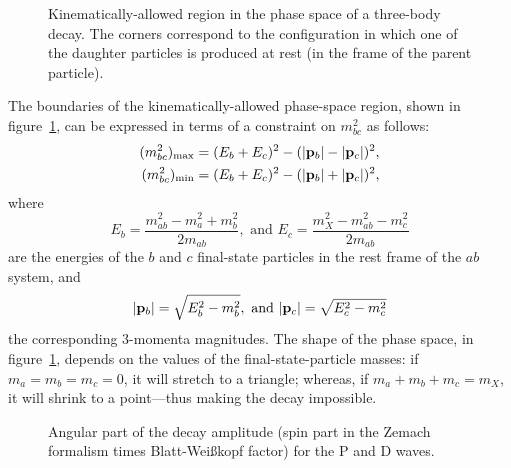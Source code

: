     \begin{figure}
        \centering
        
        \caption{Kinematically-allowed region in the phase space of a three-body decay. The corners correspond to the configuration in which one of the daughter particles is produced at rest (in the frame of the parent particle).}
        \label{fig:dalitz_kinematically_allowed}
    \end{figure}
    The boundaries of the kinematically-allowed phase-space region, shown in figure~\ref{fig:dalitz_kinematically_allowed}, can be expressed in terms of a constraint on $m_{bc}^2$ as follows:
    \begin{equation}
        \begin{aligned}
            (m_{bc}^2)_{\text{max}} &= (E_b + E_c)^2 - (\lvert\mathbf{{p}}_b\rvert - \lvert\mathbf{{p}}_c\rvert)^2,\\
            (m_{bc}^2)_{\text{min}} &= (E_b + E_c)^2 - (\lvert\mathbf{{p}}_b\rvert + \lvert\mathbf{{p}}_c\rvert)^2,
        \end{aligned}
    \end{equation}
    where
    \begin{equation}
        E_b = \frac{m_{ab}^2 - m_a^2 + m_b^2}{2m_{ab}},\text{ and }
        E_c = \frac{m_X^2 - m_{ab}^2 - m_c^2}{2 m_{ab}}
    \end{equation}
    are the energies of the $b$ and $c$ final-state particles in the rest frame of the $ab$ system, and
    \begin{equation}
        \lvert\mathbf{{p}}_b\rvert = \sqrt{E_b^2 - m_b^2},\text{ and }
        \lvert\mathbf{{p}}_c\rvert = \sqrt{E_c^2 - m_c^2}
    \end{equation}
    the corresponding 3-momenta magnitudes.
    The shape of the phase space, in figure~\ref{fig:dalitz_kinematically_allowed}, depends on the values of the final-state-particle masses:
    if $m_a = m_b = m_c = 0$, it will stretch to a triangle; whereas, if $m_a + m_b + m_c = m_X$, it will shrink to a point---thus making the decay impossible.

    \begin{figure}
        \centering

        \subfloat[]%
                 [P wave.]%
                 {}

        \subfloat[]%
                 [D wave.]%
                 {}

        \caption{Angular part of the decay amplitude (spin part in the Zemach formalism times Blatt-Wei\ss{}kopf factor) for the P and D waves.}
        \label{fig:dalitz_angular_parts}
    \end{figure}
